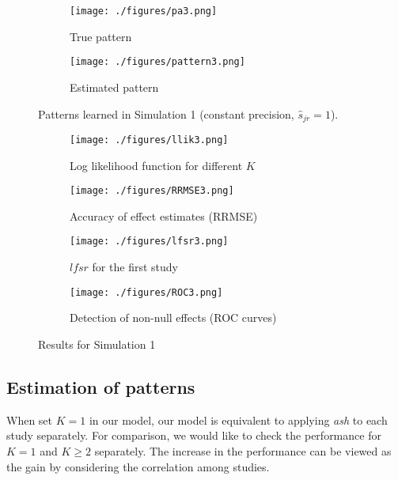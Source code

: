 \documentclass[12pt]{article}
\def\lfsr{\textit{lfsr}}
\begin{document}
\begin{figure}
\begin{subfigure}{0.5\textwidth}
\centering\texttt{[image: ./figures/pa3.png]}
    \caption{True pattern} 
\label{fig:pa3}
\end{subfigure}
\begin{subfigure}{0.5\textwidth}
\centering\texttt{[image: ./figures/pattern3.png]}
    \caption{Estimated pattern} \label{fig:pattern3}
\end{subfigure}
\caption{Patterns learned in Simulation 1 (constant precision, $\hat s_{jr}=1$).} \label{fig:pat3}
\end{figure}

\begin{figure}
\begin{subfigure}{0.5\textwidth}
\centering\texttt{[image: ./figures/llik3.png]}
    \caption{Log likelihood function for different $K$} 
\label{fig:llik3}
\end{subfigure}
\begin{subfigure}{0.5\textwidth}
\centering\texttt{[image: ./figures/RRMSE3.png]}
    \caption{Accuracy of effect estimates (RRMSE)} \label{fig:rrmse3}
\end{subfigure}
\begin{subfigure}{0.5\textwidth}
\centering\texttt{[image: ./figures/lfsr3.png]}
    \caption{$\lfsr$ for the first study} \label{fig:lfsr3}
\end{subfigure}
\begin{subfigure}{0.5\textwidth}
\centering\texttt{[image: ./figures/ROC3.png]}
    \caption{Detection of non-null effects (ROC curves)} \label{fig:roc3}
\end{subfigure}
\caption{Results for Simulation 1 } \label{fig:sim3}
\end{figure}

\vspace{5mm}
\subsection{Estimation of patterns}

\vspace{4mm} When set $K=1$ in our model, our model is equivalent to applying \emph{ash} to each study separately. For comparison, we would like to check the performance for $K=1$ and $K\geq 2$ separately. The increase in the performance can be viewed as the gain by considering the correlation among studies.
\end{document}
